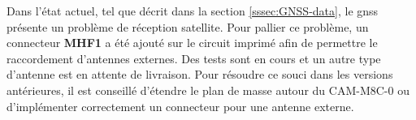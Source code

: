 Dans l'état actuel, tel que décrit dans la section \ref{sssec:GNSS-data}, le \gls{gnss} présente un problème de réception satellite. Pour pallier ce problème, un connecteur \textbf{MHF1} a été ajouté sur le circuit imprimé afin de permettre le raccordement d'antennes externes. Des tests sont en cours et un autre type d'antenne est en attente de livraison. Pour résoudre ce souci dans les versions antérieures, il est conseillé d'étendre le plan de masse autour du CAM-M8C-0 ou d'implémenter correctement un connecteur pour une antenne externe.

